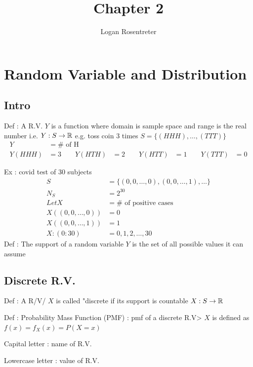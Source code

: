 

\title{Chapter 2}
\author{Logan Rosentreter}
\date{} %



\maketitle\thispagestyle{fancy}
\chapter*{Random Variable and Distribution}
\section*{Intro}
Def : 
A R.V. $Y$ is a function where domain is sample space and range is the real number i.e. $Y : S \to \mathbb{R}$ e.g. toss coin 3 times $S = \{ (HHH), \ldots, (TTT) \} $ 
\begin{align*}
    Y &= \# \text{ of H } \\
    Y(HHH) &= 3 \qquad Y(HTH) &= 2 \qquad Y(HTT) &= 1 \qquad Y(TTT) &= 0
\end{align*}

Ex : covid test of 30 subjects
\begin{align*}
    S &= \{ (0, 0, \ldots, 0), (0, 0, \ldots, 1), \ldots \} \\
    N_S &= 2^{30} \\
    Let X &= \# \text{ of positive cases} \\
    X((0, 0, \ldots, 0)) &= 0 \\
    X((0, 0, \ldots, 1)) &= 1 \\
    X:(0:30) &= 0, 1, 2, \ldots, 30
\end{align*}
Def : The support of a random variable $Y$ is the set of all possible values it can assume
\section*{Discrete R.V.}
Def : A R/V/ $X$ is called "discrete if its support is countable $X : S \to \mathbb{R}$ 

Def : Probability Mass Function (PMF) : pmf of a discrete R.V> $X$ is defined as $f(x) = f_X (x) = P(X = x)$ 

Capital letter : name of R.V.

Lowercase letter : value of R.V.

